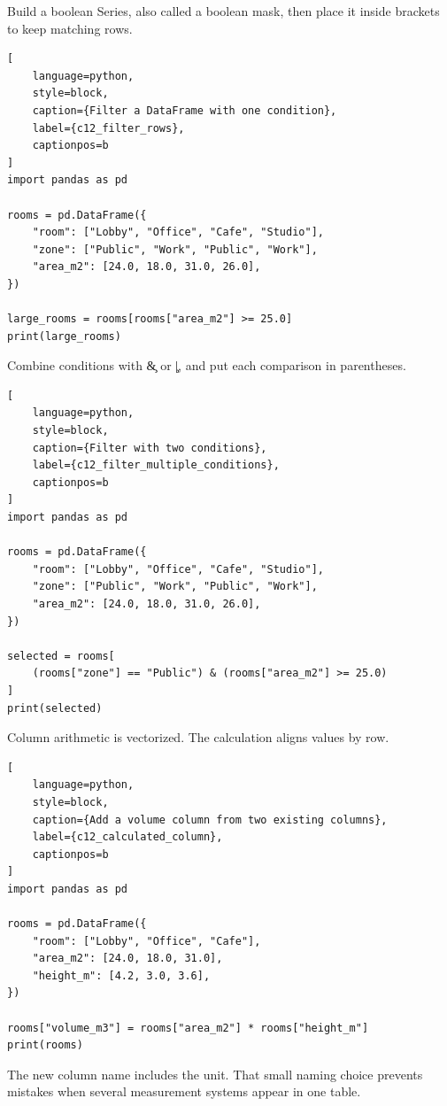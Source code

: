 
Build a boolean Series, also called a boolean mask, then place it inside
brackets to keep matching rows.

\begin{lstlisting}[
    language=python,
    style=block,
    caption={Filter a DataFrame with one condition},
    label={c12_filter_rows},
    captionpos=b
]
import pandas as pd

rooms = pd.DataFrame({
    "room": ["Lobby", "Office", "Cafe", "Studio"],
    "zone": ["Public", "Work", "Public", "Work"],
    "area_m2": [24.0, 18.0, 31.0, 26.0],
})

large_rooms = rooms[rooms["area_m2"] >= 25.0]
print(large_rooms)
\end{lstlisting}

Combine conditions with \c{&} or \c{|}, and put each comparison in
parentheses.

\begin{lstlisting}[
    language=python,
    style=block,
    caption={Filter with two conditions},
    label={c12_filter_multiple_conditions},
    captionpos=b
]
import pandas as pd

rooms = pd.DataFrame({
    "room": ["Lobby", "Office", "Cafe", "Studio"],
    "zone": ["Public", "Work", "Public", "Work"],
    "area_m2": [24.0, 18.0, 31.0, 26.0],
})

selected = rooms[
    (rooms["zone"] == "Public") & (rooms["area_m2"] >= 25.0)
]
print(selected)
\end{lstlisting}


Column arithmetic is vectorized. The calculation aligns values by row.

\begin{lstlisting}[
    language=python,
    style=block,
    caption={Add a volume column from two existing columns},
    label={c12_calculated_column},
    captionpos=b
]
import pandas as pd

rooms = pd.DataFrame({
    "room": ["Lobby", "Office", "Cafe"],
    "area_m2": [24.0, 18.0, 31.0],
    "height_m": [4.2, 3.0, 3.6],
})

rooms["volume_m3"] = rooms["area_m2"] * rooms["height_m"]
print(rooms)
\end{lstlisting}

The new column name includes the unit. That small naming choice prevents
mistakes when several measurement systems appear in one table.

